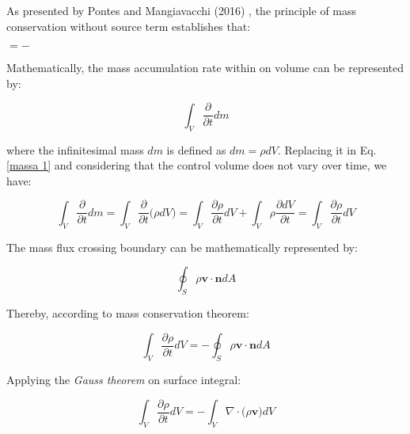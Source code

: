As presented by Pontes and Mangiavacchi (2016) \cite{pontes2016},
 the principle of mass conservation without source term
 establishes that:


\medskip
\begin{center}
           $= -$ 
\end{center}

\noindent Mathematically, the mass accumulation rate within on volume
 can be represented by:

\begin{equation} \label{massa 1} 
 \int_{V} \frac{\partial}{\partial t} dm
\end{equation}


\noindent where the infinitesimal mass $dm$ is defined
 as $dm = \rho dV$. Replacing it in Eq. \ref{massa 1}
 and considering that the control volume does not vary over time,
 we have:

\begin{equation}
 \int_{V} \frac{\partial}{\partial t} dm
 =
 \int_{V} \frac{\partial}{\partial t} \big( \rho dV \big)
 = 
 \int_{V} \frac{\partial \rho}{\partial t} dV
 +
 \int_{V} \rho \frac{\partial dV}{\partial t}
 = 
 \int_{V} \frac{\partial \rho}{\partial t} dV
\end{equation}

\medskip
\noindent The mass flux crossing boundary can be mathematically represented by:


\begin{equation}  
 \oint_{S} \rho \textbf{v} \cdot \textbf{n} dA
\end{equation}

\medskip
\noindent Thereby, according to mass conservation theorem:

\begin{equation}
 \int_{V} \frac{\partial \rho}{\partial t} dV
 = - 
 \oint_{S} \rho \textbf{v} \cdot \textbf{n} dA
\end{equation}

\medskip
\noindent Applying the \textit{Gauss theorem} on surface integral:

\begin{equation}
 \int_{V} \frac{\partial \rho}{\partial t} dV
 = - 
 \int_{V} \nabla \cdot \big( \rho \textbf{v} \big) dV
\end{equation}

